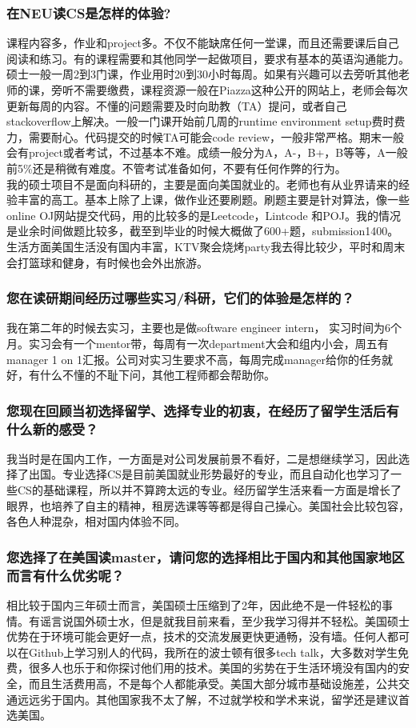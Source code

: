 \documentclass[a4paper,UTF8]{book}
\begin{document}
    \subsubsection*{在NEU读CS是怎样的体验?}
    课程内容多，作业和project多。不仅不能缺席任何一堂课，而且还需要课后自己阅读和练习。有的课程需要和其他同学一起做项目，要求有基本的英语沟通能力。硕士一般一周2到3门课，作业用时20到30小时每周。如果有兴趣可以去旁听其他老师的课，旁听不需要缴费，课程资源一般在Piazza这种公开的网站上，老师会每次更新每周的内容。不懂的问题需要及时向助教（TA）提问，或者自己stackoverflow上解决。一般一门课开始前几周的runtime environment setup费时费力，需要耐心。代码提交的时候TA可能会code review，一般非常严格。期末一般会有project或者考试，不过基本不难。成绩一般分为A，A-，B+，B等等，A一般前5\%还是稍微有难度。不管考试准备如何，不要有任何作弊的行为。\\
    我的硕士项目不是面向科研的，主要是面向美国就业的。老师也有从业界请来的经验丰富的高工。基本上除了上课，做作业还要刷题。刷题主要是针对算法，像一些online OJ网站提交代码，用的比较多的是Leetcode，Lintcode 和POJ。我的情况是业余时间做题比较多，截至到毕业的时候大概做了600+题，submission1400。
    生活方面美国生活没有国内丰富，KTV聚会烧烤party我去得比较少，平时和周末会打篮球和健身，有时候也会外出旅游。

    \subsubsection*{您在读研期间经历过哪些实习/科研，它们的体验是怎样的？}
    我在第二年的时候去实习，主要也是做software engineer intern， 实习时间为6个月。实习会有一个mentor带，每周有一次department大会和组内小会，周五有manager 1 on 1汇报。公司对实习生要求不高，每周完成manager给你的任务就好，有什么不懂的不耻下问，其他工程师都会帮助你。

    \subsubsection*{您现在回顾当初选择留学、选择专业的初衷，在经历了留学生活后有什么新的感受？}
    我当时是在国内工作，一方面是对公司发展前景不看好，二是想继续学习，因此选择了出国。专业选择CS是目前美国就业形势最好的专业，而且自动化也学习了一些CS的基础课程，所以并不算跨太远的专业。经历留学生活来看一方面是增长了眼界，也培养了自主的精神，租房选课等等都是得自己操心。美国社会比较包容，各色人种混杂，相对国内体验不同。

    \subsubsection*{您选择了在美国读master，请问您的选择相比于国内和其他国家地区而言有什么优劣呢？}
    相比较于国内三年硕士而言，美国硕士压缩到了2年，因此绝不是一件轻松的事情。有谣言说国外硕士水，但是就我目前来看，至少我学习得并不轻松。美国硕士优势在于环境可能会更好一点，技术的交流发展更快更通畅，没有墙。任何人都可以在Github上学习别人的代码，我所在的波士顿有很多tech talk，大多数对学生免费，很多人也乐于和你探讨他们用的技术。美国的劣势在于生活环境没有国内的安全，而且生活费用高，不是每个人都能承受。美国大部分城市基础设施差，公共交通远远劣于国内。其他国家我不太了解，不过就学校和学术来说，留学还是建议首选美国。
\end{document}
